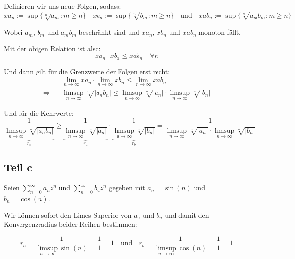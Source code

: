 \documentclass[a4paper,german,12pt,smallheadings]{scrartcl}
\begin{document}
Definieren wir uns neue Folgen, sodass: 
\begin{equation*}
xa_n:=\sup \{\sqrt[n]{a_m}:m \geq n\} \quad xb_n:=\sup \{\sqrt[n]{b_m}:m \geq n\} \quad \text{und} \quad xab_n:=\sup \{\sqrt[n]{a_mb_m}:m \geq n\}
\end{equation*}

Wobei $a_m$, $b_m$ und $a_m b_m$ beschränkt sind und $xa_n$, $xb_n$ und $xab_n$ monoton fällt.

Mit der obigen Relation ist also:
\begin{equation*}
xa_n \cdot xb_n \leq xab_n \quad \forall n 
\end{equation*}

Und dann gilt für die Grenzwerte der Folgen erst recht:
\begin{align*}
&\lim\limits_{n \to \infty} xa_n \cdot \lim\limits_{n \to \infty}xb_n \leq \lim\limits_{n \to \infty}xab_n\\
\Leftrightarrow\quad&\limsup\limits_{n \to \infty} \sqrt[n]{|a_n b_n|} \leq \limsup\limits_{n \to \infty} \sqrt[n]{|a_n|} \cdot \limsup\limits_{n \to \infty} \sqrt[n]{|b_n|}
\end{align*}

Und für die Kehrwerte:
\begin{equation*}
\underbrace{\frac{1}{\limsup\limits_{n \to \infty} \sqrt[n]{|a_n b_n|}}}_{r_c} \geq \underbrace{\frac{1}{\limsup\limits_{n \to \infty} \sqrt[n]{|a_n|}}}_{r_a} \cdot \underbrace{\frac{1}{\limsup\limits_{n \to \infty} \sqrt[n]{|b_n|}}}_{r_b} = \frac{1}{\limsup\limits_{n \to \infty} \sqrt[n]{|a_n|} \cdot \limsup\limits_{n \to \infty} \sqrt[n]{|b_n|}}
\end{equation*}


\subsection*{Teil c}

Seien $\sum\limits_{n=0}^{\infty} a_nz^n$ und $\sum\limits_{n=0}^{\infty} b_n
z^n$ gegeben mit $a_n=\sin(n)$ und $b_n=\cos(n)$.

Wir können sofort den Limes Superior von $a_n$ und $b_n$ und damit den
Konvergenzradius beider Reihen bestimmen:

\begin{equation*}
r_a=\frac{1}{\limsup\limits_{n \to \infty} \sin(n)}=\frac{1}{1}=1 \quad \text{und} \quad r_b=\frac{1}{\limsup\limits_{n \to \infty} \cos(n)}=\frac{1}{1}=1
\end{equation*}
\end{document}

